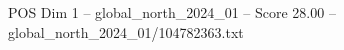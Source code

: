 \begin{textsample}{POS Dim 1 – global\_north\_2024\_01 – Score 28.00 – global\_north\_2024\_01/104782363.txt}
\end{textsample}
